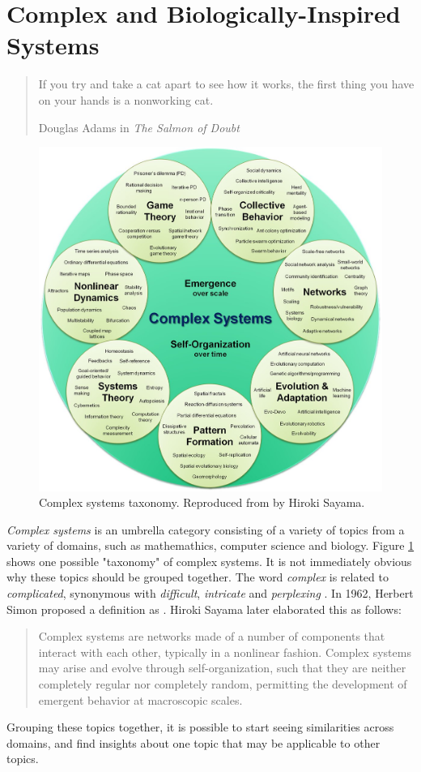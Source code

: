 \section{Complex and Biologically-Inspired Systems}

\blockquote[Douglas Adams in \textit{The Salmon of Doubt} \cite{adams2002salmon}]{
If you try and take a cat apart to see how it works, the first thing you have on your hands is a nonworking cat.
}

\begin{figure}
\centering
\includegraphics[width=\textwidth]{fig/complex_systems_sayama}
\caption[Complex systems taxonomy]{Complex systems taxonomy. Reproduced from \cite{sayama2015introduction} by Hiroki Sayama.}
\label{fig:complex_systems_taxonomy}
\end{figure}

\textit{Complex systems} is an umbrella category consisting of a variety of topics from a variety of domains, such as mathemathics, computer science and biology.
Figure \ref{fig:complex_systems_taxonomy} shows one possible "taxonomy" of complex systems.
It is not immediately obvious why these topics should be grouped together.
The word \textit{complex} is related to \textit{complicated}, synonymous with \textit{difficult}, \textit{intricate} and \textit{perplexing} \cite{Thesaurus.com2017}.
In 1962, Herbert Simon proposed a definition as .
Hiroki Sayama later elaborated this as follows:
\blockquote[\cite{sayama2015introduction}]{
Complex systems are networks made of a number of components that interact with each other, typically in a nonlinear fashion.
Complex systems may arise and evolve through self-organization, such that they are neither completely regular nor completely random, permitting the development of emergent behavior at macroscopic scales.
}
Grouping these topics together, it is possible to start seeing similarities across domains, and find insights about one topic that may be applicable to other topics.

